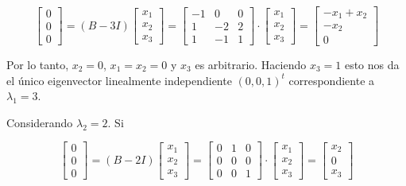 \documentclass{report}
\numberwithin{subsection}{section} %
\begin{document}
        \begin{equation*}
            \begin{bmatrix}
                0 \\ 0 \\ 0
            \end{bmatrix} = (B - 3I)
            \begin{bmatrix}
                x_1 \\ x_2 \\ x_3
            \end{bmatrix} =
            \begin{bmatrix}
                -1 & 0 & 0 \\
                1 & -2 & 2 \\
                1 & -1 & 1
            \end{bmatrix}  \cdot 
            \begin{bmatrix}
                x_1 \\ x_2 \\ x_3
            \end{bmatrix} =
            \begin{bmatrix}
                -x_1 + x_2 \\ -x_2 \\ 0
            \end{bmatrix}
        \end{equation*}
    
        Por lo tanto, $x_2 = 0$, $x_1 = x_2 = 0$ y $x_3$ es arbitrario. Haciendo $x_3 = 1$ esto nos da el único eigenvector linealmente independiente $(0, 0, 1)^t$ correspondiente a $\lambda_1 = 3$.
    
        Considerando $\lambda_2 = 2$. Si
    
        \begin{equation*}
            \begin{bmatrix}
                0 \\ 0 \\ 0
            \end{bmatrix} = (B - 2I)
            \begin{bmatrix}
                x_1 \\ x_2 \\ x_3
            \end{bmatrix} =
            \begin{bmatrix}
                0 & 1 & 0 \\
                0 & 0 & 0 \\
                0 & 0 & 1
            \end{bmatrix}  \cdot 
            \begin{bmatrix}
                x_1 \\ x_2 \\ x_3
            \end{bmatrix} =
            \begin{bmatrix}
                x_2 \\ 0 \\ x_3
            \end{bmatrix}
        \end{equation*}
        
\end{document}
